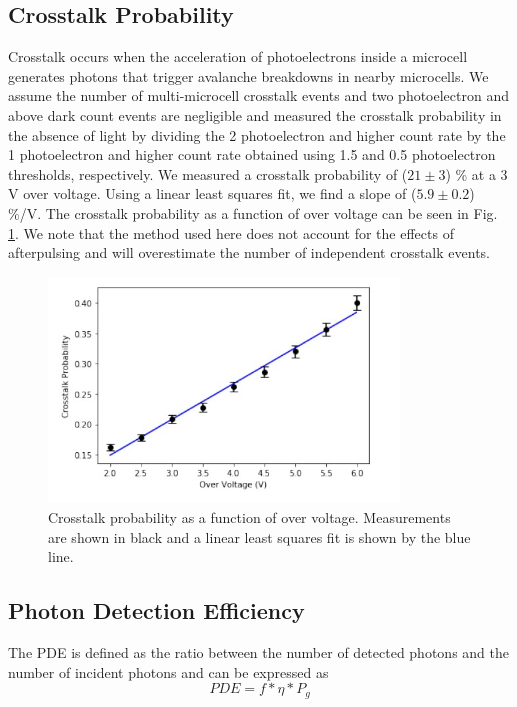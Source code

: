 \documentclass{article}
\begin{document}
\subsection{Crosstalk Probability}
Crosstalk occurs when the acceleration of photoelectrons inside a microcell generates photons that trigger avalanche breakdowns in nearby microcells. We assume the number of multi-microcell crosstalk events and two photoelectron and above dark count events are negligible and measured the crosstalk probability in the absence of light by dividing the 2 photoelectron and higher count rate by the 1 photoelectron and higher count rate obtained using 1.5 and 0.5 photoelectron thresholds, respectively. We measured a crosstalk probability of ($21 \pm 3$) \% at a 3 V over voltage. Using a linear least squares fit, we find a slope of ($5.9 \pm 0.2$) \%/V. The crosstalk probability as a function of over voltage can be seen in Fig. \ref{fig:OverVoltage}. We note that the method used here does not account for the effects of afterpulsing and will overestimate the number of independent crosstalk events.

\begin{figure}[ht]
    \centering     
    \includegraphics[height=6cm]{images/figura5.jpg}
    
    \caption{Crosstalk probability as a function of over voltage. Measurements are shown in black and a linear least squares fit is shown by the blue line.}
    \label{fig:OverVoltage}
    
\end{figure}

\subsection{Photon Detection Efficiency}
The PDE is defined as the ratio between the number of detected photons and the number of incident photons
and can be expressed as
\begin{equation}
    PDE = f * \eta * P_g
\end{equation}
\end{document}
